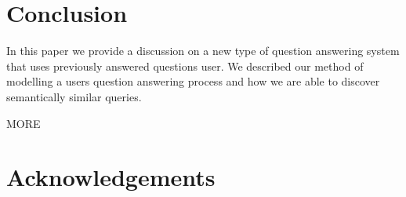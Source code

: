 
\section{Conclusion}

In this paper we provide a discussion on a new type of question answering system that uses previously answered questions user.  We described our method of modelling a users question answering process and how we are able to discover semantically similar queries.

MORE

\section{Acknowledgements}
